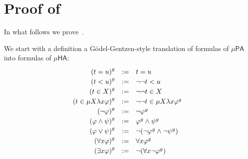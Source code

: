 \documentclass[10pt,a4paper]{amsart}
\theoremstyle{plain}
\newtheorem{lemma}[lemma]{Lemma}
\theoremstyle{definition}
\renewcommand{\phi}{\varphi}
\newcommand{\dfn}{:=}
\theoremstyle{plain}
\theoremstyle{definition} %
\newcommand{\PA}{\mathsf{PA}}
\newcommand{\HA}{\mathsf{HA}}
\newcommand{\muPA}{\mu\PA}
\newcommand{\muHA}{\mu\HA}
\begin{document}
\section{Proof of }

\label{sec:conservativity-via-double-negation}


\newcommand{\godelgentz}[1]{{#1}^{g}}
\newcommand{\friedman}[1]{{#1}^\rho}

In what follows we prove~.

% 
% 
We start with a definition a G\"{o}del-Gentzen-style translation of formulas of $\muPA$ into formulas of $\muHA$:
\[
\def\arraystretch{1.2}
\begin{array}{rcl}
    \godelgentz {(t=u)}  & \dfn & t=u \\
  \godelgentz {(t<u)}  & \dfn & \neg \neg t<u\\
  \godelgentz {(t \in X)} & \dfn & \neg \neg t \in X\\
  \godelgentz {(t \in \mu X\lambda x\phi)} & \dfn & \neg \neg t \in \mu X\lambda x\godelgentz{\phi} \\
\godelgentz {(\neg \phi)} & \dfn & \neg \godelgentz{\phi}\\
 \godelgentz {(\phi \wedge \psi)} & \dfn &  \godelgentz{\phi}\wedge \godelgentz{\psi}\\
  \godelgentz {(\phi \vee \psi)} & \dfn & \neg(\neg \godelgentz{\phi}\wedge \neg \godelgentz{\psi})\\
\godelgentz{(\forall x\phi)}  & \dfn & \forall x\godelgentz{\phi}\\
 \godelgentz{(\exists x\phi)} & \dfn & \neg (\forall x\neg \godelgentz{\phi})
\end{array}
\]
\end{document}
